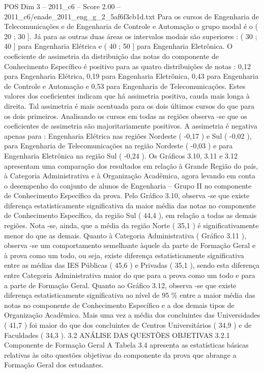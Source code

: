 \begin{textsample}{POS Dim 3 – 2011\_c6 – Score 2.00 – 2011\_c6/enade\_2011\_eng\_g\_2\_5af6f3cb1d.txt}
Para os cursos de Engenharia de Telecomunicações e de Engenharia de Controle e Automação o grupo modal é o ( 20 ; 30 ].
Já para as outras duas áreas os intervalos modais são superiores : ( 30 ; 40 ] para Engenharia Elétrica e ( 40 ; 50 ] para Engenharia Eletrônica.
O coeficiente de assimetria da distribuição das notas do componente de Conhecimento Específico é positivo para as quatro distribuições de notas : 0,12 para Engenharia Elétrica, 0,19 para Engenharia Eletrônica, 0,43 para Engenharia de Controle e Automação e 0,53 para Engenharia de Telecomunicações.
Estes valores dos coeficientes indicam que há assimetria positiva, cauda mais longa à direita.
Tal assimetria é mais acentuada para os dois últimos cursos do que para os dois primeiros.
Analisando os cursos em todas as regiões observa -se que os coeficientes de assimetria são majoritariamente positivos.
A assimetria é negativa apenas para : Engenharia Elétrica nas regiões Nordeste ( -0,17 ) e Sul ( -0,02 ), para Engenharia de Telecomunicações na região Nordeste ( -0,03 ) e para Engenharia Eletrônica na região Sul ( -0,24 ).
Os Gráficos 3.10, 3.11 e 3.12 apresentam uma comparação dos resultados em relação à Grande Região do país, à Categoria Administrativa e à Organização Acadêmica, agora levando em conta o desempenho do conjunto de alunos de Engenharia – Grupo II no componente de Conhecimento Específico da prova.
Pelo Gráfico 3.10, observa -se que existe diferença estatisticamente significativa da maior média das notas no componente de Conhecimento Específico, da região Sul ( 44,4 ), em relação a todas as demais regiões.
Nota -se, ainda, que a média da região Norte ( 35,1 ) é significativamente menor do que as demais.
Quanto à Categoria Administrativa ( Gráfico 3.11 ), observa -se um comportamento semelhante àquele da parte de Formação Geral e à prova como um todo, ou seja, existe diferença estatisticamente significativa entre as médias das IES Públicas ( 45,6 ) e Privadas ( 35,1 ), sendo esta diferença entre Categoria Administrativa maior do que para a prova como um todo e para a parte de Formação Geral.
Quanto ao Gráfico 3.12, observa -se que existe diferença estatisticamente significativa ao nível de 95 \% entre a maior média das notas no componente de Conhecimento Específico e a dos demais tipos de Organização Acadêmica.
Mais uma vez a média dos concluintes das Universidades ( 41,7 ) foi maior do que dos concluintes de Centros Universitários ( 34,9 ) e de Faculdades ( 34,3 ). 3.2 ANÁLISE DAS QUESTÕES OBJETIVAS 3.2.1 Componente de Formação Geral A Tabela 3.4 apresenta as estatísticas básicas relativas às oito questões objetivas do componente da prova que abrange a Formação Geral dos estudantes.

\end{textsample}
